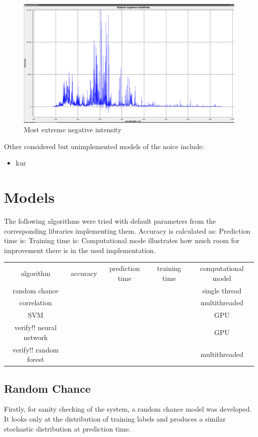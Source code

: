 \documentclass{article}
\begin{document}
\begin{figure}
\caption{Most extreme negative intensity}
\centering
\includegraphics[width=1.25\textwidth]{img/negatives}
\end{figure}
\par
Other considered but unimplemented models of the noice include:
\begin{itemize}
\item{kur}
\end{itemize}

\section{Models}
The following algorithms were tried with default parameters from the corresponding libraries implementing them.
Accuracy is calculated as:
Prediction time is:
Training time is:
Computational mode illustrates how much room for improvement there is in the used implementation.
\\ \par
{}
\begin{tabular}{ c | c | c | c | c }
algorithm      & accuracy & prediction time & training time & computational model \\
random chance  & & & & single thread \\
correlation    & & & & multithreaded \\
SVM            & & & & GPU \\ verify!!
neural network & & & & GPU \\  verify!!
random forest  & & & & multithreaded \\
\end{tabular}


\subsection{Random Chance}
Firstly, for sanity checking of the system, a random chance model was developed.
It looks only at the distribution of training labels and produces a similar stochastic distribution at prediction time.
\end{document}
